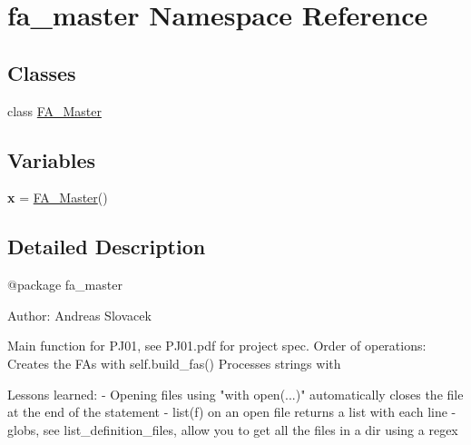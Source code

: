 \hypertarget{namespacefa__master}{}\section{fa\+\_\+master Namespace Reference}
\label{namespacefa__master}
\subsection*{Classes}
\begin{DoxyCompactItemize}
\item 
class \mbox{\hyperlink{classfa__master_1_1_f_a___master}{F\+A\+\_\+\+Master}}
\end{DoxyCompactItemize}
\subsection*{Variables}
\begin{DoxyCompactItemize}
\item 
\mbox{\label{namespacefa__master_a9336ebf25087d91c818ee6e9ec29f8c1}} 
{\bfseries x} = \mbox{\hyperlink{classfa__master_1_1_f_a___master}{F\+A\+\_\+\+Master}}()
\end{DoxyCompactItemize}


\subsection{Detailed Description}
\begin{DoxyVerb}@package fa_master

Author: Andreas Slovacek

Main function for PJ01, see PJ01.pdf for project spec. Order of operations:
Creates the FAs with self.build_fas()
Processes strings with

Lessons learned:
- Opening files using "with open(...)" automatically closes the file at the
    end of the statement
- list(f) on an open file returns a list with each line
- globs, see list_definition_files, allow you to get all the files in a dir
using a regex
\end{DoxyVerb}
 